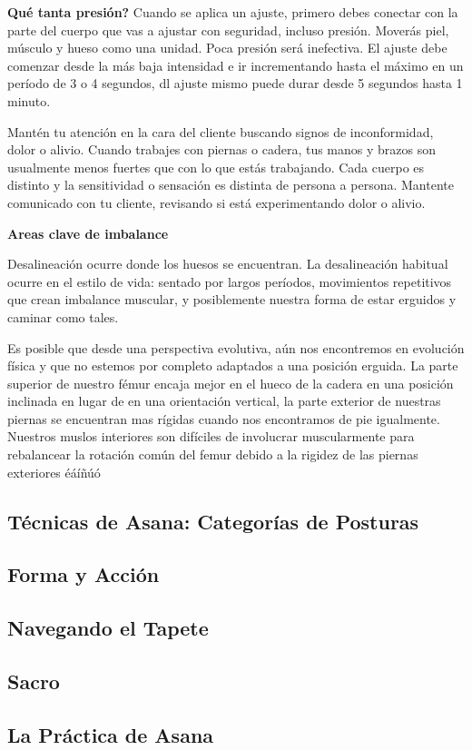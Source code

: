 \textbf{Qué tanta presión?}
Cuando se aplica un ajuste, primero debes conectar con la parte del cuerpo que vas a ajustar con seguridad, incluso presión. Moverás piel, músculo y hueso como una unidad. Poca presión será inefectiva. El ajuste debe comenzar desde la más baja intensidad e ir incrementando hasta el máximo en un período de 3 o 4 segundos, dl ajuste mismo puede durar desde 5 segundos hasta 1 minuto.

Mantén tu atención en la cara del cliente buscando signos de inconformidad, dolor o alivio. Cuando trabajes con piernas o cadera, tus manos y brazos son usualmente menos fuertes que con lo que estás trabajando. Cada cuerpo es distinto y la sensitividad o sensación es distinta de persona a persona. Mantente comunicado con tu cliente, revisando si está experimentando dolor o alivio.

\textbf{Areas clave de imbalance}

Desalineación ocurre donde los huesos se encuentran. La desalineación habitual ocurre en el estilo de vida: sentado por largos períodos, movimientos repetitivos que crean imbalance muscular, y posiblemente nuestra forma de estar erguidos y caminar como tales.

Es posible que desde una perspectiva evolutiva, aún nos encontremos en evolución física y que no estemos por completo adaptados a una posición erguida. La parte superior de nuestro fémur encaja mejor en el hueco de la cadera en una posición inclinada en lugar de en una orientación vertical, la parte exterior de nuestras piernas se encuentran mas rígidas cuando nos encontramos de pie igualmente. Nuestros muslos interiores son difíciles de involucrar muscularmente para rebalancear la rotación común del femur debido a la rigidez de las piernas exteriores
éáíñúó
\subsection{Técnicas de Asana: Categorías de Posturas}
\subsection{Forma y Acción}
\subsection{Navegando el Tapete}
\subsection{Sacro}
\subsection{La Práctica de Asana}
